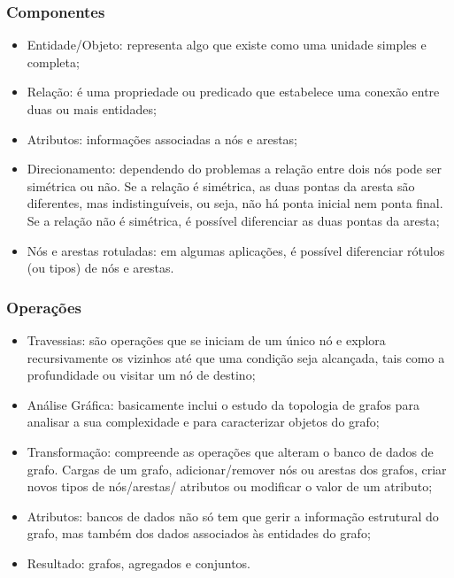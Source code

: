\documentclass{beamer}
\begin{document}

\begin{frame}
\frametitle{Componentes}
\begin{itemize}
\item Entidade/Objeto: representa algo que existe como uma unidade
  simples e completa;
\item Rela\c{c}\~ao: \'e uma propriedade ou predicado que estabelece
  uma conex\~ao entre duas ou mais entidades;
\item Atributos: informa\c{c}\~oes associadas a n\'os e arestas;
\item Direcionamento: dependendo do problemas a rela\c{c}\~ao entre
  dois n\'os pode ser sim\'etrica ou n\~ao. Se a rela\c{c}\~ao \'e
  sim\'etrica, as duas pontas da aresta s\~ao diferentes, mas
  indistingu\'iveis, ou seja, n\~ao h\'a ponta inicial nem ponta
  final. Se a rela\c{c}\~ao n\~ao \'e sim\'etrica, \'e poss\'ivel
  diferenciar as duas pontas da aresta;
\item N\'os e arestas rotuladas: em algumas aplica\c{c}\~oes, \'e
  poss\'ivel diferenciar r\'otulos (ou tipos) de n\'os e arestas.
\end{itemize}
\end{frame}


\begin{frame}
\frametitle{Opera\c{c}\~oes}
\begin{itemize}
\item Travessias: s\~ao opera\c{c}\~oes que se iniciam de um \'unico
  n\'o e explora recursivamente os vizinhos at\'e que uma
  condi\c{c}\~ao seja alcan\c{c}ada, tais como a profundidade ou
  visitar um n\'o de destino;
\item An\'alise Gr\'afica: basicamente inclui o estudo da topologia de
  grafos para analisar a sua complexidade e para caracterizar objetos
  do grafo;
\item Transforma\c{c}\~ao: compreende as opera\c{c}\~oes que alteram o
  banco de dados de grafo. Cargas de um grafo, adicionar/remover n\'os
  ou arestas dos grafos, criar novos tipos de n\'os/arestas/ atributos
  ou modificar o valor de um atributo;
\item Atributos: bancos de dados n\~ao s\'o tem que gerir a
  informa\c{c}\~ao estrutural do grafo, mas tamb\'em dos dados
  associados \`as entidades do grafo;
\item Resultado: grafos, agregados e conjuntos. 
\end{itemize}
\end{frame}
\end{document}
